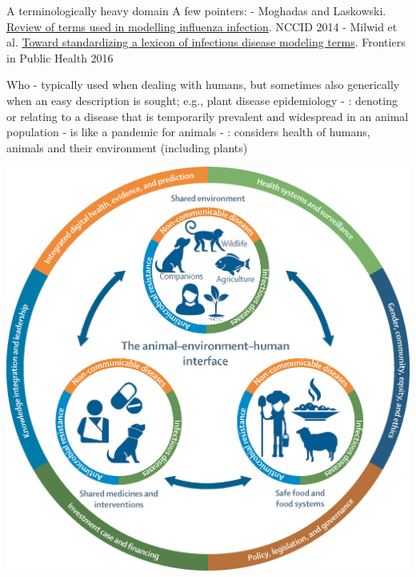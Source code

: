 \documentclass[aspectratio=169]{beamer}\usepackage[]{graphicx}\usepackage[]{xcolor}
\begin{document}
\begin{frame}{A terminologically heavy domain}
A few pointers:
\vfill
- Moghadas and Laskowski. \href{https://nccid.ca/wp-content/uploads/sites/2/2015/03/ReviewTermsFluWEB.pdf}{Review of terms used in modelling influenza infection}. NCCID 2014
\vfill
- Milwid et al. \href{https://doi.org/10.3389/fpubh.2016.00213}{Toward standardizing a lexicon of infectious disease modeling terms}. Frontiers in Public Health 2016
\end{frame}


\begin{frame}{Who}
-  typically used when dealing with humans, but sometimes also generically when an easy description is sought; e.g., plant disease epidemiology
\vfill
- : denoting or relating to a disease that is temporarily prevalent and widespread in an animal population
\vfill
-  is like a pandemic for animals
\vfill
- : considers health of humans, animals and their environment (including plants)
\end{frame}


\begin{frame}
    \centering
    \includegraphics[height=\textheight]{FIGS/gr1_lrg.jpg}
\end{frame}
\end{document}
